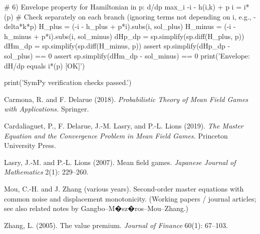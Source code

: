 ﻿\documentclass[11pt,letterpaper,oneside]{article}
\numberwithin{equation}{section}
\newcommand{\1}{\mathbf{1}}
\begin{document}
\begin{pyconsole}
# 6) Envelope property for Hamiltonian in p: d/dp max_i { -i - h(i,k) + p i } = i*(p)
#    Check separately on each branch (ignoring terms not depending on i, e.g., -delta*k*p)
H_plus  = (-i - h_plus + p*i).subs(i, sol_plus)
H_minus = (-i - h_minus + p*i).subs(i, sol_minus)
dHp_dp  = sp.simplify(sp.diff(H_plus, p))
dHm_dp  = sp.simplify(sp.diff(H_minus, p))
assert sp.simplify(dHp_dp - sol_plus) == 0
assert sp.simplify(dHm_dp - sol_minus) == 0
print('Envelope: dH/dp equals i*(p)       [OK]')

print('\nAll SymPy verification checks passed.')
\end{pyconsole}

\begin{thebibliography}{99}\small

 Carmona, R. and F. Delarue (2018).
\emph{Probabilistic Theory of Mean Field Games with Applications.}
Springer.

 Cardaliaguet, P., F. Delarue, J.-M. Lasry, and P.-L. Lions (2019).
\emph{The Master Equation and the Convergence Problem in Mean Field Games.}
Princeton University Press.

 Lasry, J.-M. and P.-L. Lions (2007).
Mean field games.
\emph{Japanese Journal of Mathematics} 2(1): 229--260.

 Mou, C.-H. and J. Zhang (various years).
Second-order master equations with common noise and displacement monotonicity.
(Working papers / journal articles; see also related notes by Gangbo--M�sz�ros--Mou--Zhang.)

 Zhang, L. (2005).
The value premium.
\emph{Journal of Finance} 60(1): 67--103.

\end{thebibliography}
\end{document}
